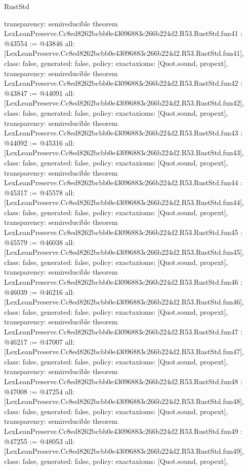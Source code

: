 \begin{lexlean}{RustStd}
\begin{coremodule}
{  transparency: semireducible
}
theorem LexLeanPreserve.Cc8ed8262bcbb0e43096883c266b224d2.R53.RustStd.fun41 : @43554 := @43846 {
  all: [LexLeanPreserve.Cc8ed8262bcbb0e43096883c266b224d2.R53.RustStd.fun41],
  class: false,
  generated: false,
  policy: exact{axioms: [Quot.sound, propext]},
  transparency: semireducible
}
theorem LexLeanPreserve.Cc8ed8262bcbb0e43096883c266b224d2.R53.RustStd.fun42 : @43847 := @44091 {
  all: [LexLeanPreserve.Cc8ed8262bcbb0e43096883c266b224d2.R53.RustStd.fun42],
  class: false,
  generated: false,
  policy: exact{axioms: [Quot.sound, propext]},
  transparency: semireducible
}
theorem LexLeanPreserve.Cc8ed8262bcbb0e43096883c266b224d2.R53.RustStd.fun43 : @44092 := @45316 {
  all: [LexLeanPreserve.Cc8ed8262bcbb0e43096883c266b224d2.R53.RustStd.fun43],
  class: false,
  generated: false,
  policy: exact{axioms: [Quot.sound, propext]},
  transparency: semireducible
}
theorem LexLeanPreserve.Cc8ed8262bcbb0e43096883c266b224d2.R53.RustStd.fun44 : @45317 := @45578 {
  all: [LexLeanPreserve.Cc8ed8262bcbb0e43096883c266b224d2.R53.RustStd.fun44],
  class: false,
  generated: false,
  policy: exact{axioms: [Quot.sound, propext]},
  transparency: semireducible
}
theorem LexLeanPreserve.Cc8ed8262bcbb0e43096883c266b224d2.R53.RustStd.fun45 : @45579 := @46038 {
  all: [LexLeanPreserve.Cc8ed8262bcbb0e43096883c266b224d2.R53.RustStd.fun45],
  class: false,
  generated: false,
  policy: exact{axioms: [Quot.sound, propext]},
  transparency: semireducible
}
theorem LexLeanPreserve.Cc8ed8262bcbb0e43096883c266b224d2.R53.RustStd.fun46 : @46039 := @46216 {
  all: [LexLeanPreserve.Cc8ed8262bcbb0e43096883c266b224d2.R53.RustStd.fun46],
  class: false,
  generated: false,
  policy: exact{axioms: [Quot.sound, propext]},
  transparency: semireducible
}
theorem LexLeanPreserve.Cc8ed8262bcbb0e43096883c266b224d2.R53.RustStd.fun47 : @46217 := @47007 {
  all: [LexLeanPreserve.Cc8ed8262bcbb0e43096883c266b224d2.R53.RustStd.fun47],
  class: false,
  generated: false,
  policy: exact{axioms: [Quot.sound, propext]},
  transparency: semireducible
}
theorem LexLeanPreserve.Cc8ed8262bcbb0e43096883c266b224d2.R53.RustStd.fun48 : @47008 := @47254 {
  all: [LexLeanPreserve.Cc8ed8262bcbb0e43096883c266b224d2.R53.RustStd.fun48],
  class: false,
  generated: false,
  policy: exact{axioms: [Quot.sound, propext]},
  transparency: semireducible
}
theorem LexLeanPreserve.Cc8ed8262bcbb0e43096883c266b224d2.R53.RustStd.fun49 : @47255 := @48053 {
  all: [LexLeanPreserve.Cc8ed8262bcbb0e43096883c266b224d2.R53.RustStd.fun49],
  class: false,
  generated: false,
  policy: exact{axioms: [Quot.sound, propext]},
}
\end{coremodule}
\end{lexlean}
